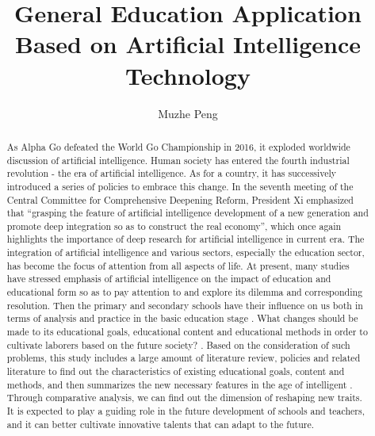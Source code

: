 \documentclass[lang=en,11pt,a4paper,towcolumn]{elegantpaper}
\title{General Education Application Based on Artificial Intelligence Technology}
\author{Muzhe Peng}
\institute{Central China Normal University Wollongkong Joint Institute}
\date{}
\begin{document}
\maketitle
\thispagestyle{fancy}         %
\fancyhead{}                     %

\begin{abstract}
  As Alpha Go defeated the World Go Championship in 2016, it exploded worldwide discussion of artificial intelligence. Human society has entered the fourth industrial revolution - the era of artificial intelligence. As for a country, it has successively introduced a series of policies to embrace this change. In the seventh meeting of the Central Committee for Comprehensive Deepening Reform, President Xi emphasized that “grasping the feature of artificial intelligence development of a new generation and promote deep integration so as to construct the real economy”, which once again highlights the importance of deep research for artificial intelligence in current era. The integration of artificial intelligence and various sectors, especially the education sector, has become the focus of attention from all aspects of life. At present, many studies have stressed emphasis of artificial intelligence on the impact of education and educational form so as to pay attention to and explore its dilemma and corresponding resolution. Then the primary and secondary schools have their influence on us both in terms of analysis and practice in the basic education stage . What changes should be made to its educational goals, educational content and educational methods in order to cultivate laborers based on the future society? . Based on the consideration of such problems, this study includes a large amount of literature review, policies and related literature to find out the characteristics of existing educational goals, content and methods, and then summarizes the new necessary features in the age of intelligent . Through comparative analysis, we can find out the dimension of reshaping new traits. It is expected to play a guiding role in the future development of schools and teachers, and it can better cultivate innovative talents that can adapt to the future.
\end{abstract}
\end{document}
